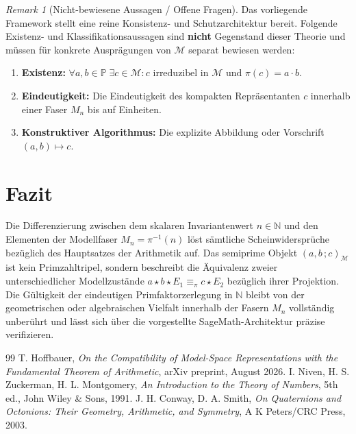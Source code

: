 \documentclass[11pt,a4paper,reqno]{amsart}
\theoremstyle{definition}
\theoremstyle{remark}
\newtheorem{remark}[theorem]{Remark}
\newcommand{\M}{\mathcal{M}}
\newcommand{\N}{\mathbb{N}}
\newcommand{\Pset}{\mathbb{P}}
\begin{document}
\begin{remark}[Nicht-bewiesene Aussagen / Offene Fragen]
Das vorliegende Framework stellt eine reine Konsistenz- und Schutzarchitektur bereit. Folgende Existenz- und Klassifikationsaussagen sind \textbf{nicht} Gegenstand dieser Theorie und müssen für konkrete Ausprägungen von $\M$ separat bewiesen werden:
\begin{enumerate}
    \item \textbf{Existenz:} $\forall a,b \in \Pset \; \exists c \in \M: c \text{ irreduzibel in } \M \text{ und } \pi(c) = a \cdot b$.
    \item \textbf{Eindeutigkeit:} Die Eindeutigkeit des kompakten Repräsentanten $c$ innerhalb einer Faser $M_n$ bis auf Einheiten.
    \item \textbf{Konstruktiver Algorithmus:} Die explizite Abbildung oder Vorschrift $(a,b) \mapsto c$.
\end{enumerate}
\end{remark}

\section{Fazit}

Die Differenzierung zwischen dem skalaren Invariantenwert $n \in \N$ und den Elementen der Modellfaser $M_n = \pi^{-1}(n)$ löst sämtliche Scheinwidersprüche bezüglich des Hauptsatzes der Arithmetik auf. Das semiprime Objekt $(a,b \,; c)_\M$ ist kein Primzahltripel, sondern beschreibt die Äquivalenz zweier unterschiedlicher Modellzustände $a \star b \star E_1 \equiv_\pi c \star E_2$ bezüglich ihrer Projektion. Die Gültigkeit der eindeutigen Primfaktorzerlegung in $\N$ bleibt von der geometrischen oder algebraischen Vielfalt innerhalb der Fasern $M_n$ vollständig unberührt und lässt sich über die vorgestellte SageMath-Architektur präzise verifizieren.

\begin{thebibliography}{99}
 T. Hoffbauer, \emph{On the Compatibility of Model-Space Representations with the Fundamental Theorem of Arithmetic}, arXiv preprint, August 2026.
 I. Niven, H. S. Zuckerman, H. L. Montgomery, \emph{An Introduction to the Theory of Numbers}, 5th ed., John Wiley \& Sons, 1991.
 J. H. Conway, D. A. Smith, \emph{On Quaternions and Octonions: Their Geometry, Arithmetic, and Symmetry}, A K Peters/CRC Press, 2003.
\end{thebibliography}
\end{document}
